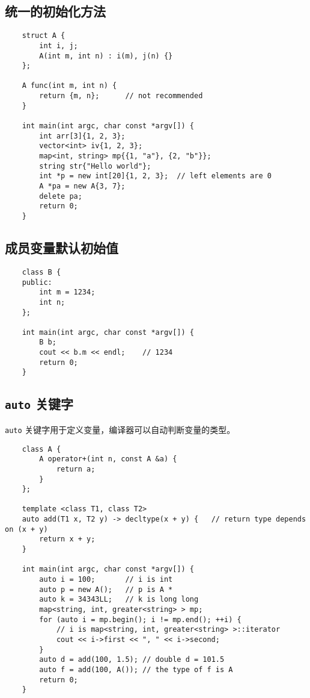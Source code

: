 \documentclass[UTF8]{ctexart}
\begin{document}
\subsection{统一的初始化方法}
\begin{verbatim}
    struct A {
        int i, j;
        A(int m, int n) : i(m), j(n) {}
    };

    A func(int m, int n) {
        return {m, n};      // not recommended
    }

    int main(int argc, char const *argv[]) {
        int arr[3]{1, 2, 3};
        vector<int> iv{1, 2, 3};
        map<int, string> mp{{1, "a"}, {2, "b"}};
        string str{"Hello world"};
        int *p = new int[20]{1, 2, 3};  // left elements are 0
        A *pa = new A{3, 7};
        delete pa;
        return 0;
    }
\end{verbatim}

\subsection{成员变量默认初始值}
\begin{verbatim}
    class B {
    public:
        int m = 1234;
        int n;
    };

    int main(int argc, char const *argv[]) {
        B b;
        cout << b.m << endl;    // 1234
        return 0;
    }
\end{verbatim}

\subsection{\texttt{auto} 关键字}
\texttt{auto} 关键字用于定义变量，编译器可以自动判断变量的类型。
\begin{verbatim}
    class A {
        A operator+(int n, const A &a) {
            return a;
        }
    };

    template <class T1, class T2>
    auto add(T1 x, T2 y) -> decltype(x + y) {   // return type depends on (x + y)
        return x + y;
    }

    int main(int argc, char const *argv[]) {
        auto i = 100;       // i is int
        auto p = new A();   // p is A *
        auto k = 34343LL;   // k is long long
        map<string, int, greater<string> > mp;
        for (auto i = mp.begin(); i != mp.end(); ++i) {
            // i is map<string, int, greater<string> >::iterator
            cout << i->first << ", " << i->second;
        }
        auto d = add(100, 1.5); // double d = 101.5
        auto f = add(100, A()); // the type of f is A
        return 0;
    }
\end{verbatim}
\end{document}
